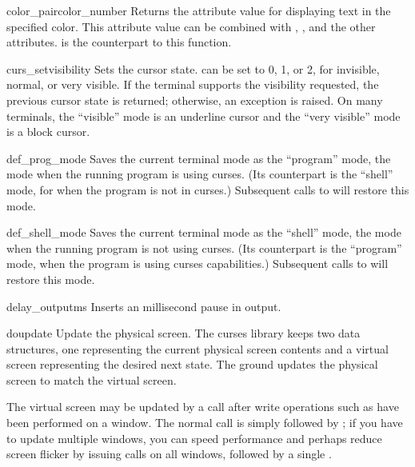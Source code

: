 \begin{funcdesc}{color_pair}{color_number}
Returns the attribute value for displaying text in the specified
color.  This attribute value can be combined with
, , and the other
 attributes.   is the
counterpart to this function.
\end{funcdesc}

\begin{funcdesc}{curs_set}{visibility}
Sets the cursor state.   can be set to 0, 1, or 2, for
invisible, normal, or very visible.  If the terminal supports the
visibility requested, the previous cursor state is returned;
otherwise, an exception is raised.  On many terminals, the ``visible''
mode is an underline cursor and the ``very visible'' mode is a block cursor.
\end{funcdesc}

\begin{funcdesc}{def_prog_mode}{}
Saves the current terminal mode as the ``program'' mode, the mode when
the running program is using curses.  (Its counterpart is the
``shell'' mode, for when the program is not in curses.)  Subsequent calls
to  will restore this mode.
\end{funcdesc}

\begin{funcdesc}{def_shell_mode}{}
Saves the current terminal mode as the ``shell'' mode, the mode when
the running program is not using curses.  (Its counterpart is the
``program'' mode, when the program is using curses capabilities.)
Subsequent calls
to  will restore this mode.
\end{funcdesc}

\begin{funcdesc}{delay_output}{ms}
Inserts an  millisecond pause in output.  
\end{funcdesc}

\begin{funcdesc}{doupdate}{}
Update the physical screen.  The curses library keeps two data
structures, one representing the current physical screen contents
and a virtual screen representing the desired next state.  The
 ground updates the physical screen to match the
virtual screen.

The virtual screen may be updated by a  call
after write operations such as  have been performed
on a window.  The normal  call is simply
 followed by ; if you have
to update multiple windows, you can speed performance and perhaps
reduce screen flicker by issuing  calls on
all windows, followed by a single .
\end{funcdesc}

